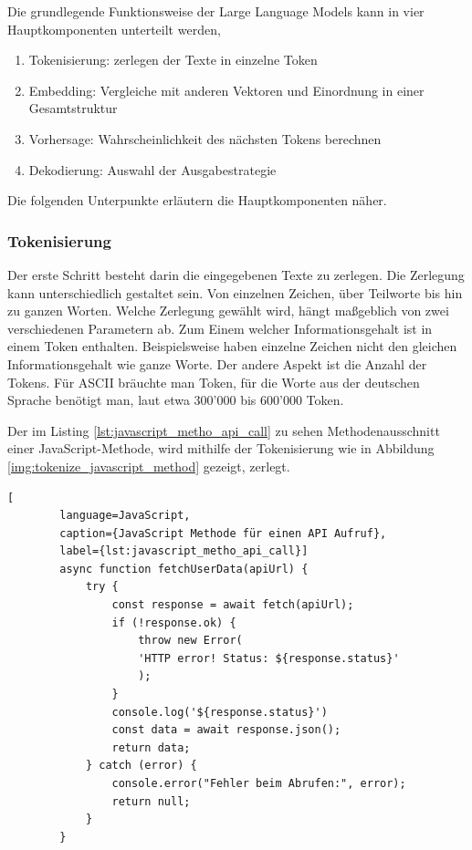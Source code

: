 Die grundlegende Funktionsweise der Large Language Models kann in vier Hauptkomponenten unterteilt werden,

\begin{enumerate}
	\item Tokenisierung: zerlegen der Texte in einzelne Token
	\item Embedding: Vergleiche mit anderen Vektoren und Einordnung in einer Gesamtstruktur
	\item Vorhersage: Wahrscheinlichkeit des nächsten Tokens berechnen
	\item Dekodierung: Auswahl der Ausgabestrategie
\end{enumerate}

Die folgenden Unterpunkte erläutern die Hauptkomponenten näher.

\subsubsection{Tokenisierung}
Der erste Schritt besteht darin die eingegebenen Texte zu zerlegen. Die Zerlegung kann unterschiedlich gestaltet sein. Von einzelnen Zeichen, über Teilworte bis hin zu ganzen Worten. Welche Zerlegung gewählt wird, hängt maßgeblich von zwei verschiedenen Parametern ab. Zum Einem welcher Informationsgehalt ist in einem Token enthalten. Beispielsweise haben einzelne Zeichen nicht den gleichen Informationsgehalt wie ganze Worte. Der andere Aspekt ist die Anzahl der Tokens. Für ASCII bräuchte man  Token, für die Worte aus der deutschen Sprache benötigt man, laut \cite{duden_unknown-author} etwa 300'000 bis 600'000 Token.\vspace{0.2cm}

Der im Listing \ref{lst:javascript_metho_api_call} zu sehen Methodenausschnitt einer JavaScript-Methode, wird mithilfe der Tokenisierung wie in Abbildung \ref{img:tokenize_javascript_method} gezeigt, zerlegt.

\begin{center}
	\begin{lstlisting}[
		language=JavaScript,
		caption={JavaScript Methode für einen API Aufruf},
		label={lst:javascript_metho_api_call}]
		async function fetchUserData(apiUrl) {
			try {
				const response = await fetch(apiUrl);
				if (!response.ok) {
					throw new Error(
					'HTTP error! Status: ${response.status}'
					);
				}
				console.log('${response.status}')
				const data = await response.json();
				return data;
			} catch (error) {
				console.error("Fehler beim Abrufen:", error);
				return null;
			}
		}
	\end{lstlisting}
\end{center}

